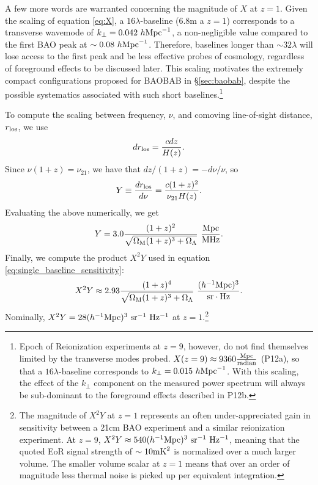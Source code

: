 \documentclass[10pt,iop]{emulateapj}
\begin{document}
A few more words are warranted concerning the magnitude of $X$ at $z=1$.  Given the scaling of equation \ref{eq:X},
a $16\lambda$-baseline (6.8m a $z=1$) corresponds to a transverse wavemode of 
$k_\perp = 0.042~h\rm{Mpc}^{-1}$, a non-negligible value compared to the first BAO peak at 
$\sim 0.08~h\rm{Mpc}^{-1}$.  Therefore, baselines longer than $\sim 32\lambda$ will 
lose access to the first peak and be less effective
probes of cosmology, regardless of foreground effects to be discussed later.  This scaling
motivates the extremely compact configurations proposed for BAOBAB in \S\ref{sec:baobab}, despite
the possible systematics associated with such short 
baselines.\footnote{Epoch of Reionization experiments at $z=9$, however, do not find themselves 
limited by the transverse modes probed. $X(z=9) \approx 9360 \frac{\rm Mpc}{\rm radian}$ (P12a), 
so that a $16\lambda$-baseline corresponds to $k_{\perp} = 0.015~h\rm{Mpc}^{-1}$.  
With this scaling, the effect of the $k_{\perp}$ component on the measured power spectrum will 
always be sub-dominant to the foreground effects described in P12b.}

To compute the scaling between frequency, $\nu$, and comoving line-of-sight distance, $r_{\rm los}$, we use
\begin{equation}
    dr_{\rm los} = \frac{c dz}{H(z)}.
\end{equation}
Since $\nu(1+z)=\nu_{21}$, we have that $dz/(1+z)=-d\nu/\nu$, so
\begin{equation}
\label{eq:Y}
    Y\equiv\frac{dr_{\rm los}}{d\nu}=\frac{c(1+z)^2}{\nu_{21} H(z)}.
\end{equation}
Evaluating the above numerically, we get
\begin{equation}
    Y = 3.0\frac{(1+z)^2}{\sqrt{\Omega_{\rm M}(1+z)^3+\Omega_\Lambda}}\ \frac{\rm Mpc}{\rm MHz}.
\end{equation}
Finally, we compute the product $X^2Y$ used in equation \ref{eq:single_baseline_sensitivity}:
\begin{equation}
    X^2Y\approx2.93\frac{(1+z)^4}{\sqrt{\Omega_{\rm M}(1+z)^3+\Omega_\Lambda}}\ \frac{{(h^{-1}\rm Mpc})^3}{{\rm sr}\cdot{\rm Hz}}.
\label{eq:cosmo_scaling}
\end{equation}
Nominally, $X^2Y=28 (h^{-1}\rm{Mpc)^3~sr^{-1}~Hz^{-1}}$
 at $z=1$.\footnote{The magnitude of $X^2Y$ at $z=1$ represents 
an often under-appreciated gain in sensitivity between a 21cm BAO experiment and a similar
reionization experiment.  At $z=9$, $X^2Y \approx 540(h^{-1}\rm{Mpc)^3~sr^{-1}~Hz^{-1}}$, 
meaning that the quoted EoR signal strength of
$\sim10\rm{mK}^2$ is normalized over a much larger volume.  The smaller volume scalar at $z=1$
means that over an order of magnitude less thermal noise is picked up per equivalent integration.}
\end{document}
